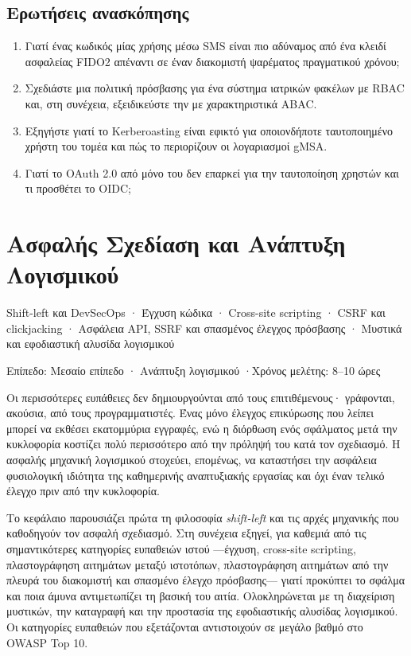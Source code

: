 \documentclass[11pt,openany]{book}
\newcommand{\chaptermeta}[3]{%
  {\sffamily\small\color{accent}#1\par}\vspace{0.3em}
  {\sffamily\footnotesize\color{gray}#2 \quad·\quad #3\par}\vspace{1.2em}}
\begin{document}
\section*{Ερωτήσεις ανασκόπησης}
\begin{enumerate}
  \item Γιατί ένας κωδικός μίας χρήσης μέσω SMS είναι πιο αδύναμος από ένα κλειδί ασφαλείας FIDO2 απέναντι σε έναν διακομιστή ψαρέματος πραγματικού χρόνου;
  \item Σχεδιάστε μια πολιτική πρόσβασης για ένα σύστημα ιατρικών φακέλων με RBAC και, στη συνέχεια, εξειδικεύστε την με χαρακτηριστικά ABAC.
  \item Εξηγήστε γιατί το Kerberoasting είναι εφικτό για οποιονδήποτε ταυτοποιημένο χρήστη του τομέα και πώς το περιορίζουν οι λογαριασμοί gMSA.
  \item Γιατί το OAuth 2.0 από μόνο του δεν επαρκεί για την ταυτοποίηση χρηστών και τι προσθέτει το OIDC;
\end{enumerate}

\chapter{Ασφαλής Σχεδίαση και Ανάπτυξη Λογισμικού}\label{ch:9}
\chaptermeta{Shift-left και DevSecOps · Έγχυση κώδικα · Cross-site scripting · CSRF και clickjacking · Ασφάλεια API, SSRF και σπασμένος έλεγχος πρόσβασης · Μυστικά και εφοδιαστική αλυσίδα λογισμικού}{Επίπεδο: Μεσαίο επίπεδο · Ανάπτυξη λογισμικού}{Χρόνος μελέτης: 8–10 ώρες}

Οι περισσότερες ευπάθειες δεν δημιουργούνται από τους επιτιθέμενους· γράφονται, ακούσια, από τους προγραμματιστές. Ένας μόνο έλεγχος επικύρωσης που λείπει μπορεί να εκθέσει εκατομμύρια εγγραφές, ενώ η διόρθωση ενός σφάλματος μετά την κυκλοφορία κοστίζει πολύ περισσότερο από την πρόληψή του κατά τον σχεδιασμό. Η ασφαλής μηχανική λογισμικού στοχεύει, επομένως, να καταστήσει την ασφάλεια φυσιολογική ιδιότητα της καθημερινής αναπτυξιακής εργασίας και όχι έναν τελικό έλεγχο πριν από την κυκλοφορία.

Το κεφάλαιο παρουσιάζει πρώτα τη φιλοσοφία \emph{shift-left} και τις αρχές μηχανικής που καθοδηγούν τον ασφαλή σχεδιασμό. Στη συνέχεια εξηγεί, για καθεμιά από τις σημαντικότερες κατηγορίες ευπαθειών ιστού —έγχυση, cross-site scripting, πλαστογράφηση αιτημάτων μεταξύ ιστοτόπων, πλαστογράφηση αιτημάτων από την πλευρά του διακομιστή και σπασμένο έλεγχο πρόσβασης— γιατί προκύπτει το σφάλμα και ποια άμυνα αντιμετωπίζει τη βασική του αιτία. Ολοκληρώνεται με τη διαχείριση μυστικών, την καταγραφή και την προστασία της εφοδιαστικής αλυσίδας λογισμικού. Οι κατηγορίες ευπαθειών που εξετάζονται αντιστοιχούν σε μεγάλο βαθμό στο OWASP Top 10.
\end{document}
